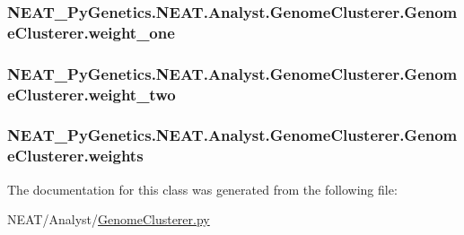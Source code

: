 \subsubsection[{\texorpdfstring{weight\+\_\+one}{weight_one}}]{\setlength{\rightskip}{0pt plus 5cm}N\+E\+A\+T\+\_\+\+Py\+Genetics.\+N\+E\+A\+T.\+Analyst.\+Genome\+Clusterer.\+Genome\+Clusterer.\+weight\+\_\+one\hspace{0.3cm}{\ttfamily [static]}}\hypertarget{classNEAT__PyGenetics_1_1NEAT_1_1Analyst_1_1GenomeClusterer_1_1GenomeClusterer_ac1f8f1740d1a6663cc8fb29fe29f3c35}{}\label{classNEAT__PyGenetics_1_1NEAT_1_1Analyst_1_1GenomeClusterer_1_1GenomeClusterer_ac1f8f1740d1a6663cc8fb29fe29f3c35}
\subsubsection[{\texorpdfstring{weight\+\_\+two}{weight_two}}]{\setlength{\rightskip}{0pt plus 5cm}N\+E\+A\+T\+\_\+\+Py\+Genetics.\+N\+E\+A\+T.\+Analyst.\+Genome\+Clusterer.\+Genome\+Clusterer.\+weight\+\_\+two\hspace{0.3cm}{\ttfamily [static]}}\hypertarget{classNEAT__PyGenetics_1_1NEAT_1_1Analyst_1_1GenomeClusterer_1_1GenomeClusterer_a2541d20300efb0cff96a18abb6a85d81}{}\label{classNEAT__PyGenetics_1_1NEAT_1_1Analyst_1_1GenomeClusterer_1_1GenomeClusterer_a2541d20300efb0cff96a18abb6a85d81}
\subsubsection[{\texorpdfstring{weights}{weights}}]{\setlength{\rightskip}{0pt plus 5cm}N\+E\+A\+T\+\_\+\+Py\+Genetics.\+N\+E\+A\+T.\+Analyst.\+Genome\+Clusterer.\+Genome\+Clusterer.\+weights\hspace{0.3cm}{\ttfamily [static]}}\hypertarget{classNEAT__PyGenetics_1_1NEAT_1_1Analyst_1_1GenomeClusterer_1_1GenomeClusterer_aff7fba61d7cd8eeeed9149ed48211699}{}\label{classNEAT__PyGenetics_1_1NEAT_1_1Analyst_1_1GenomeClusterer_1_1GenomeClusterer_aff7fba61d7cd8eeeed9149ed48211699}


The documentation for this class was generated from the following file\+:\begin{DoxyCompactItemize}
\item 
N\+E\+A\+T/\+Analyst/\hyperlink{GenomeClusterer_8py}{Genome\+Clusterer.\+py}\end{DoxyCompactItemize}

